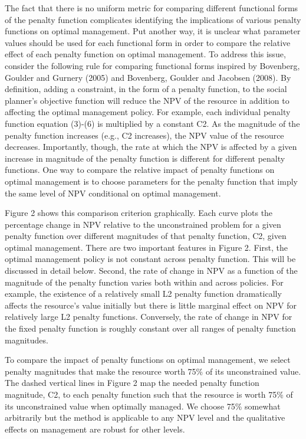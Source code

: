 \documentclass[authoryear, review, 12pt]{elsarticle}
\begin{document}
{\color{red}
The fact that there is no uniform metric for comparing different functional forms of the penalty function complicates identifying the implications of various penalty functions on optimal management.  Put another way, it is unclear what parameter values should be used for each functional form in order to compare the relative effect of each penalty function on optimal management.  
To address this issue, consider the following rule for comparing functional forms inspired by Bovenberg, Goulder and Gurnery (2005) and Bovenberg, Goulder and Jacobsen (2008).  By definition, adding a constraint, in the form of a penalty function, to the social planner’s objective function will reduce the NPV of the resource in addition to affecting the optimal management policy.  For example, each individual penalty function equation (3)-(6) is multiplied by a constant C2.  As the magnitude of the penalty function increases (e.g., C2 increases), the NPV value of the resource decreases.  Importantly, though, the rate at which the NPV is affected by a given increase in magnitude of the penalty function is different for different penalty functions.  One way to compare the relative impact of penalty functions on optimal management is to choose parameters for the penalty function that imply the same level of NPV conditional on optimal management. 

Figure 2 shows this comparison criterion graphically.  Each curve plots the percentage change in NPV relative to the unconstrained problem for a given penalty function over different magnitudes of that penalty function, C2, given optimal management.  There are two important features in Figure 2.  First, the optimal management policy is not constant across penalty function.  This will be discussed in detail below.  Second, the rate of change in NPV as a function of the magnitude of the penalty function varies both within and across policies.  For example, the existence of a relatively small L2 penalty function dramatically affects the resource’s value initially but there is little marginal effect on NPV for relatively large L2 penalty functions.  Conversely, the rate of change in NPV for the fixed penalty function is roughly constant over all ranges of penalty function magnitudes.  

To compare the impact of penalty functions on optimal management, we select penalty magnitudes that make the resource worth 75\% of its unconstrained value.   The dashed vertical lines in Figure 2 map the needed penalty function magnitude, C2, to each penalty function such that the resource is worth 75\% of its unconstrained value when optimally managed.  We choose 75\% somewhat arbitrarily but the method is applicable to any NPV level and the qualitative effects on management are robust for other levels.  

}
\end{document}
